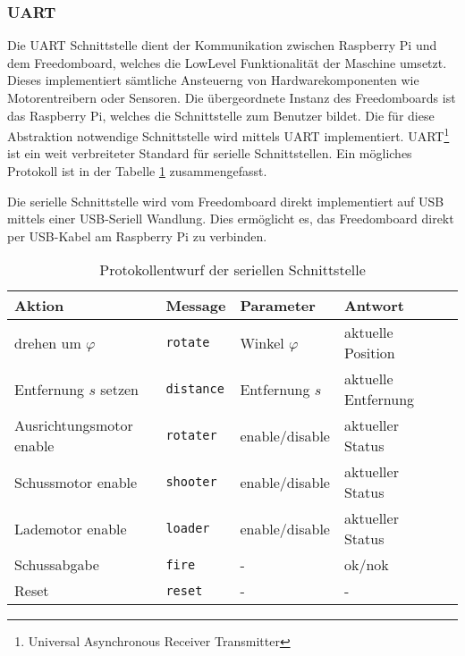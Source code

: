 \subsubsection{UART}
\label{subsub:uart}
Die UART Schnittstelle dient der Kommunikation zwischen Raspberry Pi und
dem Freedomboard, welches die LowLevel Funktionalität der Maschine 
umsetzt. Dieses implementiert sämtliche Ansteuerng von Hardwarekomponenten
wie Motorentreibern oder Sensoren. Die übergeordnete Instanz des Freedomboards
ist das Raspberry Pi, welches die Schnittstelle zum Benutzer bildet. Die für
diese Abstraktion notwendige Schnittstelle wird mittels UART
implementiert. UART\footnote{Universal Asynchronous Receiver Transmitter} ist ein weit verbreiteter Standard für serielle Schnittstellen.  Ein mögliches Protokoll ist in der Tabelle \ref{tab:uart}
zusammengefasst.

Die serielle Schnittstelle wird vom Freedomboard direkt implementiert auf
USB mittels einer USB-Seriell Wandlung. Dies ermöglicht es, das Freedomboard
direkt per USB-Kabel am Raspberry Pi zu verbinden.

\begin{table}[h!]
	\centering
	\begin{tabular}{l l l l l}
		Aktion & Message & Parameter & Antwort \\
		\hline
		drehen um $\varphi$ 
			& \verb!rotate!
			& Winkel $\varphi$
			& aktuelle Position \\
		Entfernung $s$ setzen
			& \verb!distance!
			& Entfernung $s$
			& aktuelle Entfernung \\
		Ausrichtungsmotor enable
			& \verb!rotater!
			& enable/disable
			& aktueller Status\\
		Schussmotor enable
			& \verb!shooter! 
			& enable/disable
			& aktueller Status \\
		Lademotor enable
			& \verb!loader!
			& enable/disable
			& aktueller Status\\
		Schussabgabe
			& \verb!fire!
			& -
			& ok/nok\\
		Reset
			& \verb!reset!
			& -
			& -\\
	\end{tabular}
	\caption{Protokollentwurf der seriellen Schnittstelle}
	\label{tab:uart}
\end{table}
